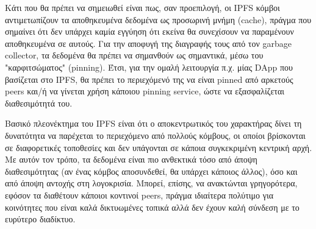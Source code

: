 Κάτι που θα πρέπει να σημειωθεί είναι πως, σαν προεπιλογή, οι IPFS κόμβοι αντιμετωπίζουν τα αποθηκευμένα δεδομένα ως προσωρινή μνήμη (cache), πράγμα που σημαίνει ότι δεν υπάρχει καμία εγγύηση ότι εκείνα θα συνεχίσουν να παραμένουν αποθηκευμένα σε αυτούς. Για την αποφυγή της διαγραφής τους από τον garbage collector, τα δεδομένα θα πρέπει να σημανθούν ως σημαντικά, μέσω του "καρφιτσώματος" (pinning). Έτσι, για την ομαλή λειτουργία π.χ. μίας DApp που βασίζεται στο IPFS, θα πρέπει το περιεχόμενό της να είναι pinned από αρκετούς peers και/ή να γίνεται χρήση κάποιου pinning service, ώστε να εξασφαλίζεται διαθεσιμότητά του.

Βασικό πλεονέκτημα του IPFS είναι ότι ο αποκεντρωτικός του χαρακτήρας δίνει τη δυνατότητα να παρέχεται το περιεχόμενο από πολλούς κόμβους, οι οποίοι βρίσκονται σε διαφορετικές τοποθεσίες και δεν υπάγονται σε κάποια συγκεκριμένη κεντρική αρχή. Με αυτόν τον τρόπο, τα δεδομένα είναι πιο ανθεκτικά τόσο από άποψη διαθεσιμότητας (αν ένας κόμβος αποσυνδεθεί, θα υπάρχει κάποιος άλλος), όσο και από άποψη αντοχής στη λογοκρισία. Μπορεί, επίσης, να ανακτώνται γρηγορότερα, εφόσον τα διαθέτουν κάποιοι κοντινοί peers, πράγμα ιδιαίτερα πολύτιμο για κοινότητες που είναι καλά δικτυωμένες τοπικά αλλά δεν έχουν καλή σύνδεση με το ευρύτερο διαδίκτυο.